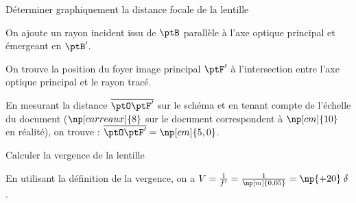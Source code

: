 \debutEntrainement


\begin{enonce}
Déterminer graphiquement la distance focale de la lentille
\end{enonce}


\begin{corrige}
On ajoute un rayon incident issu de $\ptB$ parallèle à l'axe optique principal et émergeant en $\ptB'$. 

On trouve la position du foyer image principal $\ptF'$ à l'intersection entre l'axe optique principal et le rayon tracé. 

En mesurant la distance $\overline{\ptO\ptF'}$ sur le schéma et en tenant compte de l'échelle du document ($\np[carreaux]{8}$ sur le document correspondent à $\np[cm]{10}$ en réalité), on trouve : $\overline{\ptO\ptF'}=\np[cm]{5,0}$.
\end{corrige}




\begin{enonce}
Calculer la vergence de la lentille
\end{enonce}


\begin{corrige}
En utilisant la définition de la vergence, on a $V=\frac{1}{f'}=\frac{1}{\np[m]{0,05}}=\np{+20}\;\delta$.
\end{corrige}



\finEntrainement









